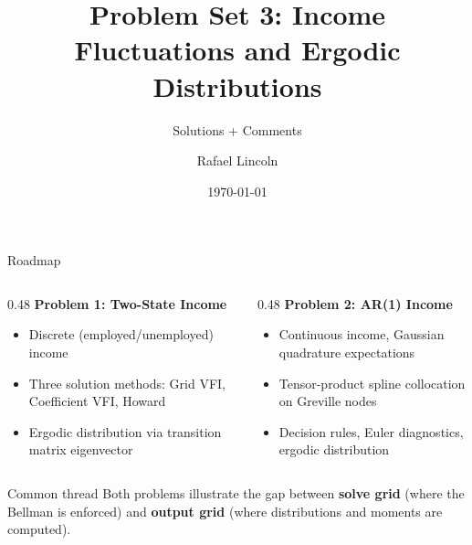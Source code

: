 \documentclass[aspectratio=169,11pt]{beamer}
\title{Problem Set 3: Income Fluctuations and Ergodic Distributions}
\subtitle{Solutions + Comments}
\author{Rafael Lincoln}
\institute{New York University}
\date{\today}
\begin{document}
\begin{frame}[plain]
    \titlepage
\end{frame}

\begin{frame}{Roadmap}
    \begin{columns}[T]
        \begin{column}{0.48\textwidth}
            \textbf{Problem 1: Two-State Income}
            \begin{itemize}\setlength\itemsep{0.2em}
                \item Discrete (employed/unemployed) income
                \item Three solution methods: Grid VFI, Coefficient VFI, Howard
                \item Ergodic distribution via transition matrix eigenvector
            \end{itemize}
        \end{column}
        \begin{column}{0.48\textwidth}
            \textbf{Problem 2: AR(1) Income}
            \begin{itemize}\setlength\itemsep{0.2em}
                \item Continuous income, Gaussian quadrature expectations
                \item Tensor-product spline collocation on Greville nodes
                \item Decision rules, Euler diagnostics, ergodic distribution
            \end{itemize}
        \end{column}
    \end{columns}
    \vspace{0.5em}
    \begin{alertblock}{Common thread}
        \small Both problems illustrate the gap between \textbf{solve grid} (where the Bellman is enforced) and \textbf{output grid} (where distributions and moments are computed).
    \end{alertblock}
\end{frame}

\end{document}
